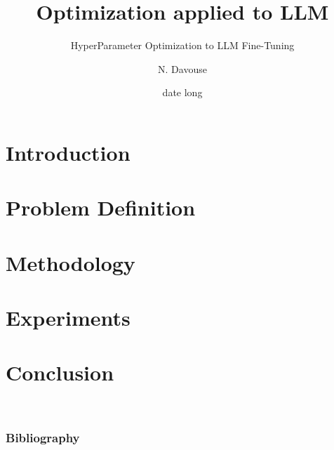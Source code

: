 \documentclass[A4,svgnames,9pt,aspectratio=169]{beamer}
\title[titrecourt]{Optimization applied to LLM}
\subtitle{HyperParameter Optimization to LLM Fine-Tuning}
\date[12/11/2024]{date long}
\author[A. et al.]{N. Davouse}
\begin{document}

\frame{\titlepage}


\renewcommand{\contentsname}{Summary}



\frame{\tocpage}

\section{Introduction}
\frame{\sectionpage}


\section{Problem Definition}
\frame{\sectionpage}


\section{Methodology}
\frame{\sectionpage}


\section{Experiments}
\frame{\sectionpage}



\section{Conclusion}


\
\begin{frame}
\frametitle{Bibliography}
\printbibliography
\nocite{*}
\end{frame}







\renewcommand{\thankyou}{Thank You.}
\frame{\merci}

\end{document}
